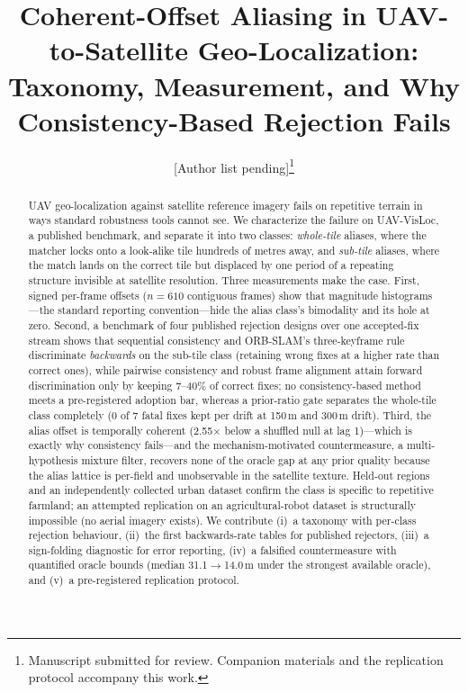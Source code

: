 \documentclass[journal]{IEEEtran}
\begin{document}
\title{Coherent-Offset Aliasing in UAV-to-Satellite Geo-Localization:\\ Taxonomy, Measurement, and Why Consistency-Based Rejection Fails}

\author{[Author list pending]\thanks{Manuscript submitted for review. Companion materials and the replication protocol accompany this work.}}


\maketitle

\begin{abstract}
UAV geo-localization against satellite reference imagery fails on repetitive terrain in ways standard robustness tools cannot see. We characterize the failure on UAV-VisLoc, a published benchmark, and separate it into two classes: \emph{whole-tile} aliases, where the matcher locks onto a look-alike tile hundreds of metres away, and \emph{sub-tile} aliases, where the match lands on the correct tile but displaced by one period of a repeating structure invisible at satellite resolution. Three measurements make the case. First, signed per-frame offsets ($n=610$ contiguous frames) show that magnitude histograms---the standard reporting convention---hide the alias class's bimodality and its hole at zero. Second, a benchmark of four published rejection designs over one accepted-fix stream shows that sequential consistency and ORB-SLAM's three-keyframe rule discriminate \emph{backwards} on the sub-tile class (retaining wrong fixes at a higher rate than correct ones), while pairwise consistency and robust frame alignment attain forward discrimination only by keeping 7--40\% of correct fixes; no consistency-based method meets a pre-registered adoption bar, whereas a prior-ratio gate separates the whole-tile class completely (0 of 7 fatal fixes kept per drift at 150\,m and 300\,m drift). Third, the alias offset is temporally coherent (2.55$\times$ below a shuffled null at lag 1)---which is exactly why consistency fails---and the mechanism-motivated countermeasure, a multi-hypothesis mixture filter, recovers none of the oracle gap at any prior quality because the alias lattice is per-field and unobservable in the satellite texture. Held-out regions and an independently collected urban dataset confirm the class is specific to repetitive farmland; an attempted replication on an agricultural-robot dataset is structurally impossible (no aerial imagery exists). We contribute (i)~a taxonomy with per-class rejection behaviour, (ii)~the first backwards-rate tables for published rejectors, (iii)~a sign-folding diagnostic for error reporting, (iv)~a falsified countermeasure with quantified oracle bounds (median 31.1$\to$14.0\,m under the strongest available oracle), and (v)~a pre-registered replication protocol.
\end{abstract}
\end{document}
